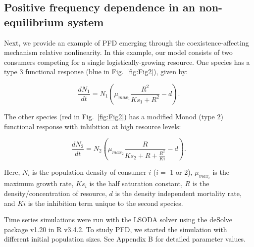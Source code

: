 				
				
\subsection{Positive frequency dependence in an non-equilibrium system}
Next, we provide an example of PFD emerging through the coexistence-affecting mechanism relative nonlinearity. In this example, our model consists of two consumers competing for a single logistically-growing resource. One species has a type 3 functional response (blue in Fig.~\ref{fig:Fig2}), given by: 
				
\begin{equation}
\frac{dN_{1}}{dt} = N_{1}(\mu _{max_{1}}\frac{R^2}{Ks_{1} + R^2}-d).\tag{3.15}\label{eq:3.15}
\end{equation}
				
The other species (red in Fig.~\ref{fig:Fig2}) has a modified Monod (type 2) functional response with inhibition at high resource levels: 
				
\begin{equation}
\frac{dN_{2}}{dt} = N_{2}(\mu _{max_{2}}\frac{R}{Ks_{2} + R + \frac{R^2}{Ki}}-d).\tag{3.16}\label{eq:3.16}
\end{equation}
				
Here, $N_{i}$ is the population density of consumer $i$ ($i = $ 1 or 2), $\mu_{max_{i}}$ is the maximum growth rate, $Ks_{i}$ is the half saturation constant, $R$ is the density/concentration of resource, $d$ is the density independent mortality rate, and $Ki$ is the inhibition term unique to the second species. 
\par


Time series simulations were run with the LSODA solver using the deSolve package v1.20 \citep{soetaert2016package} in R v3.4.2. To study PFD, we started the simulation with different initial population sizes. See Appendix B for detailed parameter values. 
\par

				


